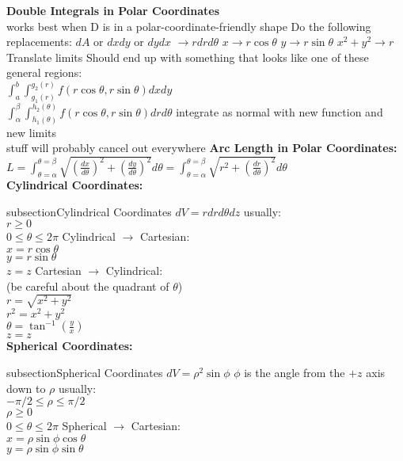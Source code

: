 \documentclass{article}
\newcommand{\upspace}{\vspace{0px}}
\newcommand{\zzz}[1]{\0 {\textbf{#1:}} \addcontentsline{toc} {subsection}{#1}}
\newcommand{\aaa}{\upspace \1}
\newcommand{\bbb}{\upspace \2}
\newcommand{\ccc}{\upspace \3}
\begin{document}
\begin{multicols*}{2}
\begin{outline}[compactitem]
	\aaa \textbf{Double Integrals in Polar Coordinates}
	\\ works best when D is in a polar-coordinate-friendly shape
		\bbb Do the following replacements:
			\ccc $dA$ or $dxdy$ or $dydx$ $\rightarrow r dr d\theta$
			\ccc $x \rightarrow r\cos\theta$
			\ccc $y \rightarrow r\sin\theta$
			\ccc $x^2 + y^2 \rightarrow r$
			\ccc Translate limits
		\bbb Should end up with something that looks like one of these general regions:
		\\ $\int_a^b \int_{g_1(r)}^{g_2(r)} f(r\cos\theta,r\sin\theta) dx dy $
		\\ $\int_\alpha^\beta \int_{h_1(\theta)}^{h_2(\theta)} f(r\cos\theta,r\sin\theta) dr d\theta $
		\bbb integrate as normal with new function and new limits
		\\ stuff will probably cancel out everywhere
	\aaa \textbf{Arc Length in Polar Coordinates:}
	\\ $L = \int_{\theta=\alpha}^{\theta=\beta}\sqrt{ \left(\frac{dx}{d\theta} \right)^2 + \left(\frac{dy}{d\theta}\right)^2} d\theta = \int_{\theta=\alpha}^{\theta=\beta}\sqrt{ r^2 + \left( \frac{dr}{d\theta} \right)^2} d\theta$
\\
\zzz{Cylindrical Coordinates}
	\aaa $dV = r dr d\theta dz$
	\aaa usually:
		\\ $r \geq 0$
		\\ $0 \leq \theta \leq 2\pi$
	\aaa Cylindrical $\rightarrow$ Cartesian:
	\\ $x = r\cos\theta$
	\\ $y = r\sin\theta$
	\\ $z = z$
	\aaa Cartesian $\rightarrow$ Cylindrical:
	\\ (be careful about the quadrant of $\theta$)
	\\ $r = \sqrt{x^2 + y^2}$
	\\ $r^2 = x^2 + y^2$
	\\ $\theta = \tan^{-1}\left(\frac{y}{x}\right)$
	\\ $z = z$
\\
\zzz{Spherical Coordinates}
	\aaa $dV = \rho^2 \sin\phi$
	\aaa $\phi$ is the angle from the $+z$ axis down to $\rho$
		\bbb usually:
		\\ $-\pi/2 \leq \rho \leq \pi/2$
		\\ $\rho \geq 0$
		\\ $0 \leq \theta \leq 2\pi$
	\aaa Spherical $\rightarrow$ Cartesian:
	\\ $x = \rho\sin\phi\cos\theta$
	\\ $y = \rho\sin\phi\sin\theta$

\end{outline}
\end{multicols*}
\end{document}
